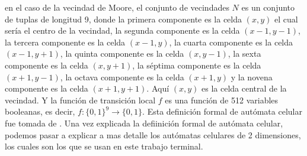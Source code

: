         en el caso de la vecindad de Moore, el conjunto de vecindades $N$ es un conjunto de tuplas de longitud 9, donde la primera componente es la celda
        $(x,y)$ el cual ser\'ia el centro de la vecindad, la segunda componente es la celda $(x-1,y-1)$, la tercera componente es la celda $(x-1,y)$,
        la cuarta componente es la celda $(x-1,y+1)$, la quinta componente es la celda $(x,y-1)$, la sexta componente es la celda $(x,y+1)$, la s\'eptima
        componente es la celda $(x+1,y-1)$, la octava componente es la celda $(x+1,y)$ y la novena componente es la celda $(x+1,y+1)$. Aqu\'i 
        $(x,y)$ es la celda central de la vecindad. Y la funci\'on de transici\'on local $f$ es una funci\'on de 512 variables booleanas, es decir,
        $f: \{0,1\}^{9} \rightarrow \{0,1\}$.
    \vskip 0.5cm
    Esta definici\'on formal de aut\'omata celular fue tomada de \cite{Codd1968}. Una vez explicada la defiinici\'on formal de aut\'omata celular,
        podemos pasar a explicar a mas detalle los aut\'omatas celulares de 2 dimensiones, los cuales son los que se usan en este trabajo terminal.
    \vskip 0.5cm